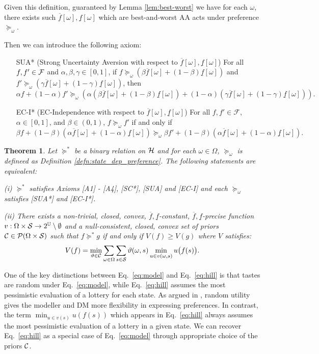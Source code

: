 \documentclass[11pt,oneside]{article}
\theoremstyle{plain}
\theoremstyle{plain}
\theoremstyle{plain}
\newtheorem{thm}{Theorem}[section]
\theoremstyle{plain}
\theoremstyle{plain}
\theoremstyle{definition}
\theoremstyle{definition}
\theoremstyle{remark}
\theoremstyle{plain}
\newcommand{\F}{{\cal F}}
\newcommand{\ulf}{\underline{f}}
\newcommand{\olf}{\overline{f}}
\newcommand{\pfo}{\pf_\omega}
\newcommand{\mcs}{{\cal S}}
\newcommand{\pf}{\succeq}
\newcommand{\pfs}{\succeq^*}
\newcommand{\convmix}[2]{\alpha #1 + (1-\alpha) #2}
\newcommand{\convexmix}[3]{#3 #1 + (1-#3) #2}
\newcommand{\ulfo}{\ulf[\omega]}
\newcommand{\olfo}{\olf[\omega]}
\begin{document}
Given this definition, guaranteed by Lemma \ref{lem:best-worst} we have for each $\omega$, there exists such $\olf[\omega],\ulf[\omega]$ which are best-and-worst AA acts under preference $\pfo$.

Then we can introduce the following axiom:
%
\begin{itemize}
    \item[SUA*] (Strong Uncertainty Aversion with respect to $\olf[\omega],\ulf[\omega]$) For all $f,f' \in \F$ and $\alpha, \beta, \gamma \in [0,1]$,
    if $f \pfo \left(\beta \olf[\omega] + (1-\beta) \underline{f}[\omega]\right)$ and $f' \pfo \left(\gamma \overline{f}[\omega] + (1-\gamma) \underline{f}[\omega]\right)$, 
    then $$\convmix{f}{f'} \pfo \left(\convmix{\left(\beta \overline{f}[\omega] + (1-\beta)\underline{f}[\omega]\right)}{\left(\gamma \overline{f}[\omega] + (1-\gamma) \underline{f}[\omega]\right)}\right).$$ 
    \item [EC-I*] (EC-Independence with respect to $\olfo,\ulfo$) For all $f,f' \in \mathcal{F}$, $\alpha \in [0,1]$, and $\beta \in(0,1)$, $f \pfo f'$ if and only if 
    $$
    \convexmix{f}{\left(\convmix{\olfo}{\ulfo}\right)}{\beta} \pfo \convexmix{f'}{\left(\convmix{\olfo}{\ulfo}\right)}{\beta}.
    $$
\end{itemize}

\begin{thm}
\label{thm:MEU_Pessimistic_MEU}
    Let $\pfs$ be a binary relation on ${\cal H}$ and for each $\omega \in \Omega$, $\pfo$ is defineed as Definition \ref{defn:state_dep_preference}. The following statements are equivalent:

    (i) $\pfs$ satisfies Axioms [A1] - [A4], [SC*], [SUA] and [EC-I] and each $\pfo$ satisfies [SUA*] and [EC-I*].
    
    (ii) There exists a non-trivial, closed, convex, $\olf,\ulf$-constant, $\olf,\ulf$-precise function $v:\Omega \times \mcs \to 2^{\mathbb{U}}\setminus \emptyset$ and a null-consistent,
    closed, convex set of priors ${\cal C} \in {\cal P}(\Omega \times \mcs)$ such that $f \pfs g$ if and only if $V(f) \geq V(g)$ where $V$ satisfies:
    \[
    V(f) = \min_{\vartheta \in {\cal C}} \sum_{\omega \in \Omega} \sum_{s \in \mcs} \vartheta(\omega,s) \min_{u \in v(\omega,s)} u\big(f(s)\big).
    \]
\end{thm}

One of the key distinctions between Eq.~\eqref{eq:model} and Eq.~\eqref{eq:hill} is that tastes are random under Eq.~\eqref{eq:model}, while Eq.~\eqref{eq:hill} assumes the most pessimistic evaluation of a lottery for each state.
As argued in \cite{hu2024distributional}, random utility gives the modeller and DM more flexibility in expressing preferences. In contrast, the term $\min_{u \in v(s)}u\left(f(s)\right)$ which appears in Eq.~\eqref{eq:hill} always assumes the most pessimistic evaluation of a lottery in a given state. We can recover Eq.~\eqref{eq:hill} as a special case of Eq.~\eqref{eq:model} through appropriate choice of the priors ${\cal C}$.
\end{document}
